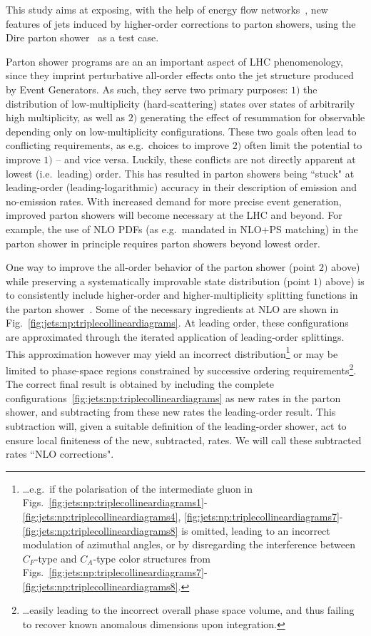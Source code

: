 
This study aims at exposing, with the help of energy flow 
networks~\cite{Komiske:2018cqr}, new features of jets induced by higher-order
corrections to parton showers, using the Dire parton shower~\cite{Hoche:2015sya}
as a test case.

Parton shower programs are an an important aspect
of LHC phenomenology, since they imprint perturbative all-order effects onto the
jet structure produced by Event Generators. As such, they serve two primary
purposes: $1)$ the distribution of low-multiplicity
(hard-scattering) states over states of arbitrarily high multiplicity, as well
as $2)$ generating the effect of resummation for observable depending only on 
low-multiplicity configurations. These two goals often lead to conflicting
requirements, as e.g.\ choices to improve
$2)$ often limit the potential to improve $1)$ -- and vice versa. Luckily,
these conflicts are not directly apparent at lowest (i.e.\ leading) order. This
has resulted in parton showers being ``stuck" at leading-order 
(leading-logarithmic) accuracy in their description of emission and 
no-emission rates. With increased demand for more precise event generation, 
improved parton showers will become necessary at the LHC and beyond. For 
example, the use of NLO PDFs (as e.g.\ mandated in NLO+PS
matching) in the parton shower in principle requires parton showers beyond
lowest order.

One way to improve the all-order behavior of the parton shower (point $2)$ 
above) while preserving a systematically improvable state distribution (point $1)$ 
above) is to consistently include higher-order and higher-multiplicity 
splitting functions in the parton 
shower~\cite{Li:2016yez, Hoche:2017iem,Dulat:2018vuy}. Some of the 
necessary ingredients at NLO are shown in 
Fig.~\ref{fig:jets:np:triplecollineardiagrams}. 
At leading order, these configurations are approximated through the iterated 
application of leading-order splittings. This approximation however may
yield an incorrect distribution\footnote{\dots e.g.\ if the polarisation of 
the intermediate gluon in 
Figs.~\ref{fig:jets:np:triplecollineardiagrams1}-\ref{fig:jets:np:triplecollineardiagrams4},
\ref{fig:jets:np:triplecollineardiagrams7}-\ref{fig:jets:np:triplecollineardiagrams8}
is omitted, leading to an incorrect modulation of azimuthal angles,
or by disregarding the interference between
$C_F$-type and $C_A$-type color structures from 
Figs.~\ref{fig:jets:np:triplecollineardiagrams7}-\ref{fig:jets:np:triplecollineardiagrams8}.}
or may be limited to phase-space regions constrained by successive 
ordering requirements\footnote{\dots easily leading to the 
incorrect overall phase space volume, and thus failing to recover known anomalous
dimensions upon integration.}.
The correct final result is obtained by including the 
complete configurations~\ref{fig:jets:np:triplecollineardiagrams}
as new rates in the parton shower, and subtracting from these new rates
the leading-order result. This subtraction will, given a suitable definition
of the leading-order shower, act to ensure local finiteness of the new, 
subtracted, rates. We will call these subtracted rates ``NLO corrections".

